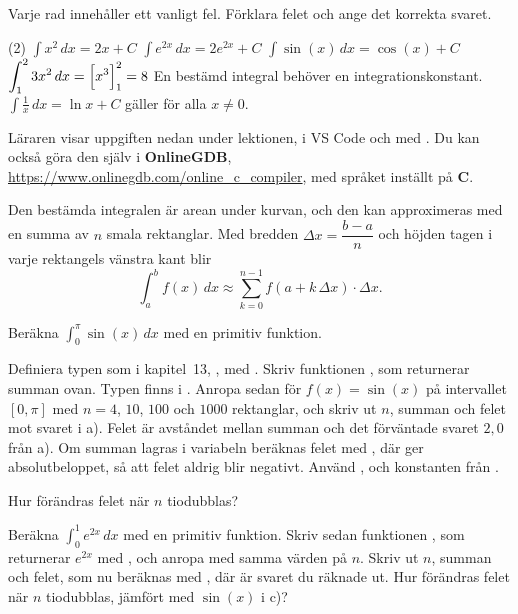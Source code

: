 Varje rad innehåller ett vanligt fel. Förklara felet och ange det korrekta svaret.
\begin{delar}(2)
  \task $\displaystyle\int x^2\,dx = 2x + C$
  \task $\displaystyle\int e^{2x}\,dx = 2e^{2x} + C$
  \task $\displaystyle\int \sin(x)\,dx = \cos(x) + C$
  \task $\displaystyle\int_1^2 3x^2\,dx = \Bigl[x^3\Bigr]_1^2 = 8$
  \task* En bestämd integral behöver en integrationskonstant.
  \task* $\displaystyle\int \frac{1}{x}\,dx = \ln x + C$ gäller för alla $x \neq 0$.
\end{delar}

Läraren visar uppgiften nedan under lektionen, i VS Code och med . Du kan också göra den
själv i \textbf{OnlineGDB}, \url{https://www.onlinegdb.com/online_c_compiler}, med språket inställt
på \textbf{C}.

Den bestämda integralen är arean under kurvan, och den kan approximeras med en summa av $n$ smala
rektanglar. Med bredden $\Delta x = \dfrac{b - a}{n}$ och höjden tagen i varje rektangels vänstra
kant blir
\[
  \int_a^b f(x)\,dx \approx \sum_{k=0}^{n-1} f(a + k\,\Delta x) \cdot \Delta x.
\]
\begin{parts}
  \item Beräkna $\displaystyle\int_0^{\pi} \sin(x)\,dx$ med en primitiv funktion.
  \item Definiera typen  som i kapitel~13, , med
    . Skriv funktionen
    , som returnerar summan
    ovan. Typen  finns i . Anropa sedan
     för $f(x) = \sin(x)$ på intervallet $[0, \pi]$ med
    $n = 4$, $10$, $100$ och $1000$ rektanglar, och skriv ut $n$, summan och felet mot svaret i
    a). Felet är avståndet mellan summan och det förväntade svaret $2{,}0$ från a). Om summan
    lagras i variabeln  beräknas felet med , där 
    ger absolutbeloppet, så att felet aldrig blir negativt. Använd , 
    och konstanten  från .
  \item Hur förändras felet när $n$ tiodubblas?
  \item Beräkna $\displaystyle\int_0^{1} e^{2x}\,dx$ med en primitiv funktion. Skriv sedan
    funktionen , som returnerar $e^{2x}$ med
    , och anropa  med samma värden på
    $n$. Skriv ut $n$, summan och felet, som nu beräknas med , där
     är svaret du räknade ut. Hur förändras felet när $n$ tiodubblas, jämfört med
    $\sin(x)$ i c)?
\end{parts}
